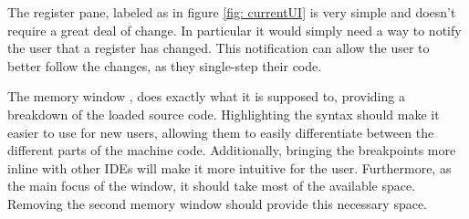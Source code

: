 The register pane, labeled as  in figure \ref{fig: currentUI} is very simple and doesn't require a great deal of change. In particular it would simply need a way to notify the user that a register has changed. This notification can allow the user to better follow the changes, as they single-step their code.

The memory window , does exactly what it is supposed to, providing a breakdown of the loaded source code. Highlighting the syntax should make it easier to use for new users, allowing them to easily differentiate between the different parts of the machine code. Additionally, bringing the breakpoints more inline with other IDEs will make it more intuitive for the user. Furthermore, as the main focus of the window, it should take most of the available space. Removing the second memory window should provide this necessary space.

